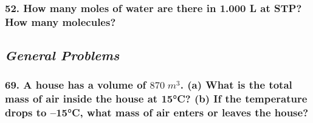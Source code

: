 \documentclass{article}
\begin{document}
\subsubsection*{
    52. How many moles of water are there in 1.000 L at STP? How many molecules?
}
\newpage
\begin{center}
    \subsection*{\textbf{\textit{General Problems}}}
\end{center}
\subsubsection*{
    69. A house has a volume of $870\;m^3$. (a) What is the total mass of air inside
    the house at 15°C? (b) If the temperature drops to –15°C, what mass of air
    enters or leaves the house?
}
\end{document}
